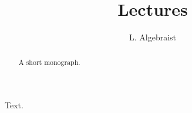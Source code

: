 \documentclass{amsbook}
\begin{document}
\frontmatter
\title{Lectures}
\author{L. Algebraist}
\begin{abstract}
A short monograph.
\end{abstract}
\maketitle
Text.
\end{document}
